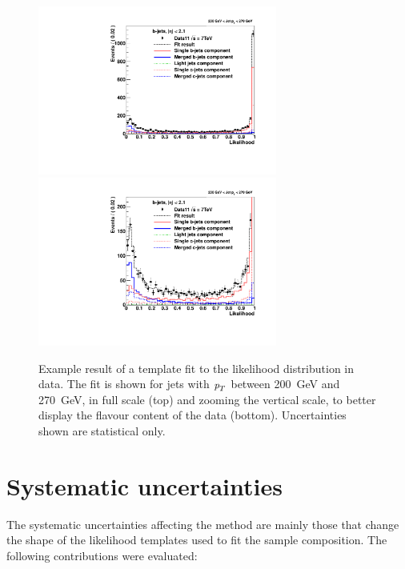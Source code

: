 \begin{figure}[tp]
\centering
\includegraphics[width=0.7\textwidth]{FIGS/Fits/LikelihoodFit_3param_ETAFull_Bin5.pdf}
\includegraphics[width=0.7\textwidth]{FIGS/Fits/LikelihoodFit_3param_ETAFull_ZOOM_Bin5.pdf}
\caption{Example result of a template fit to the likelihood distribution in data. The fit is shown for jets with ${\emph{p}_{T}}$ between  200~GeV and 270~GeV, in full scale (top) and zooming the vertical scale, to better display the flavour content of the data (bottom). Uncertainties shown are statistical only.}
\label{fig:fittemplates2}
\end{figure}


\section{Systematic uncertainties}\label{sec:FractionSystematics}

The systematic uncertainties affecting the method are mainly those that change the shape of the likelihood templates used to fit the sample composition. The following contributions were evaluated:

